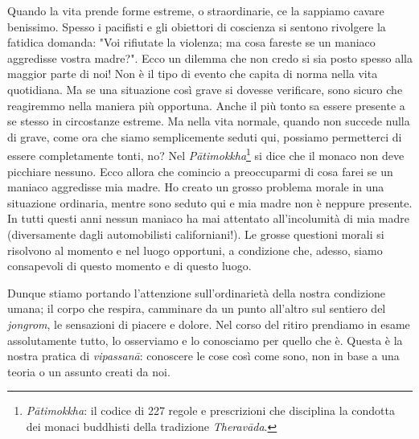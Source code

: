 Quando la vita prende forme estreme, o straordinarie, ce la sappiamo
cavare benissimo. Spesso i pacifisti e gli obiettori di coscienza si
sentono rivolgere la fatidica domanda: "Voi rifiutate la violenza; ma
cosa fareste se un maniaco aggredisse vostra madre?". Ecco un dilemma
che non credo si sia posto spesso alla maggior parte di noi! Non è il
tipo di evento che capita di norma nella vita quotidiana. Ma se una
situazione così grave si dovesse verificare, sono sicuro che reagiremmo
nella maniera più opportuna. Anche il più tonto sa essere presente a se
stesso in circostanze estreme. Ma nella vita normale, quando non succede
nulla di grave, come ora che siamo semplicemente seduti qui, possiamo
permetterci di essere completamente tonti, no? Nel \textit{Pātimokkha}\footnote{\textit{Pātimokkha}: il codice di 227 regole e prescrizioni che
disciplina la condotta dei monaci buddhisti della tradizione \textit{Theravāda}.}
si dice che il monaco non deve picchiare nessuno. Ecco allora che
comincio a preoccuparmi di cosa farei se un maniaco aggredisse mia
madre. Ho creato un grosso problema morale in una situazione ordinaria,
mentre sono seduto qui e mia madre non è neppure presente. In tutti
questi anni nessun maniaco ha mai attentato all'incolumità di mia madre
(diversamente dagli automobilisti californiani!). Le grosse questioni
morali si risolvono al momento e nel luogo opportuni, a condizione che,
adesso, siamo consapevoli di questo momento e di questo luogo.

Dunque stiamo portando l'attenzione sull'ordinarietà della nostra
condizione umana; il corpo che respira, camminare da un punto all'altro
sul sentiero del \textit{jongrom}, le sensazioni di piacere e dolore. Nel corso
del ritiro prendiamo in esame assolutamente tutto, lo osserviamo e lo
conosciamo per quello che è. Questa è la nostra pratica di \textit{vipassanā}:
conoscere le cose così come sono, non in base a una teoria o un assunto
creati da noi.

